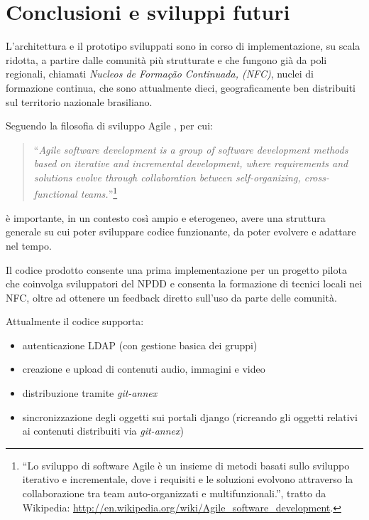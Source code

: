 
\chapter{Conclusioni e sviluppi futuri}
\label{Capitolo5}

L'architettura e il prototipo sviluppati sono in corso di
implementazione, su scala ridotta, a partire dalle comunità più
strutturate e che fungono già da poli regionali, chiamati
\emph{Nucleos de Formação Continuada, (NFC)}, nuclei di formazione
continua, che sono attualmente dieci, geograficamente ben distribuiti
sul territorio nazionale brasiliano.

Seguendo la filosofia di sviluppo Agile \citep{Agile}, per cui: 

\begin{quote}
  ``\emph{Agile software development is a group of software
    development methods based on iterative and incremental
    development, where requirements and solutions evolve through
    collaboration between self-organizing, cross-functional
    teams.}''\footnote{``Lo sviluppo di software Agile è un insieme di
    metodi basati sullo sviluppo iterativo e incrementale, dove i
    requisiti e le soluzioni evolvono attraverso la collaborazione tra
    team auto-organizzati e multifunzionali.'', tratto da Wikipedia:
    \url{http://en.wikipedia.org/wiki/Agile_software_development}.}
\end{quote}

è importante, in un contesto così ampio e eterogeneo, avere una
struttura generale su cui poter sviluppare codice funzionante, da
poter evolvere e adattare nel tempo.

Il codice prodotto consente una prima implementazione per un progetto
pilota che coinvolga sviluppatori del NPDD e consenta la formazione di
tecnici locali nei NFC, oltre ad ottenere un feedback diretto sull'uso
da parte delle comunità.

Attualmente il codice supporta:
\begin{itemize}
\item autenticazione LDAP (con gestione basica dei gruppi)
\item creazione e upload di contenuti audio, immagini e video
\item distribuzione tramite \emph{git-annex}
\item sincronizzazione degli oggetti sui portali django (ricreando gli
  oggetti relativi ai contenuti distribuiti via \emph{git-annex})
\end{itemize}

